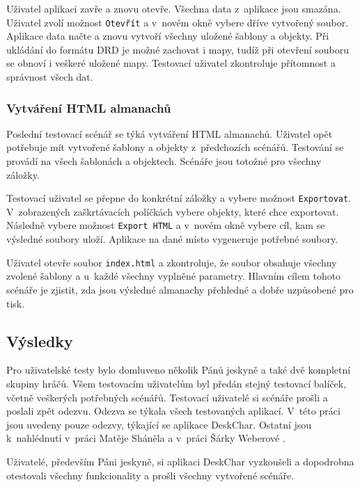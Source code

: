 \documentclass[thesis=B,czech]{resources/FITthesis}[2012/06/26]
\begin{document}
Uživatel aplikaci zavře a znovu otevře. Všechna data z~aplikace jsou smazána. Uživatel zvolí možnost \texttt{Otevřít} a v~novém okně vybere dříve vytvořený soubor. Aplikace data načte a znovu vytvoří všechny uložené šablony a objekty. Při ukládání do formátu DRD je možné zachovat i mapy, tudíž při otevření souboru se obnoví i veškeré uložené mapy. Testovací uživatel zkontroluje přítomnost a správnost všech dat. 

\subsubsection{Vytváření HTML almanachů}
Poslední testovací scénář se týká vytváření HTML almanachů. Uživatel opět potřebuje mít vytvořené šablony a objekty z~předchozích scénářů. Testování se provádí na všech šablonách a objektech. Scénáře jsou totožné pro všechny záložky. \par

Testovací uživatel se přepne do konkrétní záložky a vybere možnost \texttt{Exportovat}. V~zobrazených zaškrtávacích políčkách vybere objekty, které chce exportovat. Následně vybere možnost \texttt{Export HTML} a v~novém okně vybere cíl, kam se výsledné soubory uloží. Aplikace na dané místo vygeneruje potřebné soubory. \par

Uživatel otevře soubor \texttt{index.html} a zkontroluje, že soubor obsahuje všechny zvolené šablony a u~každé všechny vyplněné parametry. Hlavním cílem tohoto scénáře je zjistit, zda jsou výsledné almanachy přehledné a dobře uzpůsobené pro tisk.

\subsection{Výsledky}
Pro uživatelské testy bylo domluveno několik Pánů jeskyně a také dvě kompletní skupiny hráčů. Všem testovacím uživatelům byl předán stejný testovací balíček, včetně veškerých potřebných scénářů. Testovací uživatelé si scénáře prošli a poslali zpět odezvu. Odezva se týkala všech testovaných aplikací. V~této práci jsou uvedeny pouze odezvy, týkající se aplikace DeskChar. Ostatní jsou k~nahlédnutí v~práci Matěje Sháněla\cite{Shanel_2017} a v~práci Šárky Weberové \cite{Weberova_2017}. \par

Uživatelé, především Páni jeskyně, si aplikaci DeskChar vyzkoušeli a dopodrobna otestovali všechny funkcionality a prošli všechny vytvořené scénáře. \par
\end{document}
